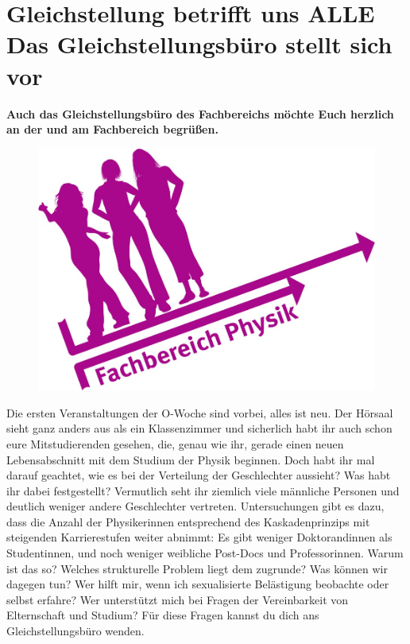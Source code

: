 \section[Gleichstellungsbüro am FB11]{Gleichstellung betrifft uns ALLE\\ Das Gleichstellungsbüro stellt sich vor}

\begin{multicols}{2}

\textbf{Auch das Gleichstellungsbüro des Fachbereichs möchte Euch herzlich an der \UniMuenster{} und am Fachbereich begrüßen.}

\begin{figure}
    \vspace*{-0.3cm}
    \includegraphics[width=\linewidth]{res/gst_buero.jpg}
\end{figure}

Die ersten Veranstaltungen der O-Woche sind vorbei, alles ist neu. Der Hörsaal sieht ganz anders aus als ein Klassenzimmer und sicherlich habt ihr auch schon eure Mitstudierenden gesehen, die, genau wie ihr, gerade einen neuen Lebensabschnitt mit dem Studium der Physik beginnen. Doch habt ihr mal darauf geachtet, wie es bei der Verteilung der Geschlechter aussieht? Was habt ihr dabei festgestellt? Vermutlich seht ihr ziemlich viele männliche Personen und deutlich weniger andere Geschlechter vertreten. Untersuchungen gibt es dazu, dass die Anzahl der Physikerinnen entsprechend des Kaskadenprinzips mit steigenden Karrierestufen weiter abnimmt: Es gibt weniger Doktorandinnen als Studentinnen, und noch weniger weibliche Post-Docs und Professorinnen. Warum ist das so? Welches strukturelle Problem liegt dem zugrunde? Was können wir dagegen tun? Wer hilft mir, wenn ich sexualisierte Belästigung beobachte oder selbst erfahre? Wer unterstützt mich bei Fragen der Vereinbarkeit von Elternschaft und Studium? Für diese Fragen kannst du dich ans Gleichstellungsbüro wenden.


\end{multicols}
